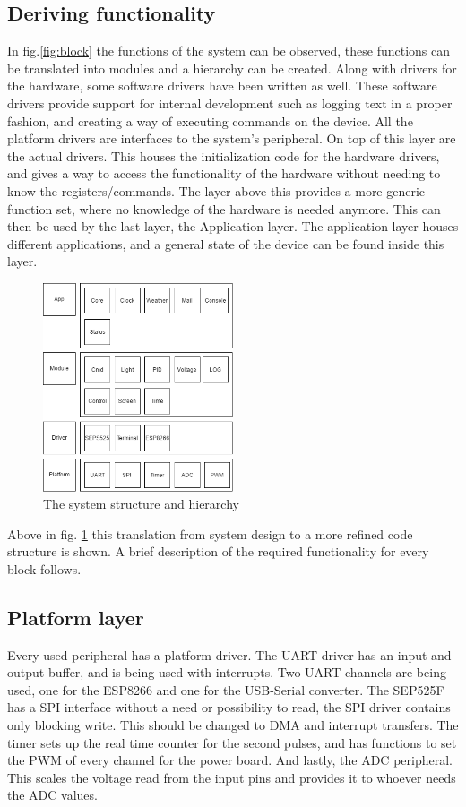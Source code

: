 \subsection{Deriving functionality}
In fig.\ref{fig:block} the functions of the system can be observed, these functions can be translated into modules and a hierarchy can be created. Along with drivers for the hardware, some software drivers have been written as well. These software drivers provide support for internal development such as logging text in a proper fashion, and creating a way of executing commands on the device. All the platform drivers are interfaces to the system's peripheral. On top of this layer are the actual drivers. This houses the initialization code for the hardware drivers, and gives a way to access the functionality of the hardware without needing to know the registers/commands. The layer above this provides a more generic function set, where no knowledge of the hardware is needed anymore. This can then be used by the last layer, the Application layer. The application layer houses different applications, and a general state of the device can be found inside this layer.
\begin{figure}[H]
	\centering
	\label{fig:block_code}
	\includegraphics[width=0.5\textwidth]{fig/block_code.png}
	\caption{The system structure and hierarchy}
\end{figure}
Above in fig. \ref{fig:block_code} this translation from system design to a more refined code structure is shown. A brief description of the required functionality for every block follows. 

\subsection{Platform layer}

Every used peripheral has a platform driver. The UART driver has an input and output buffer, and is being used with interrupts. Two UART channels are being used, one for the ESP8266 and one for the USB-Serial converter. The SEP525F has a SPI interface without a need or possibility to read, the SPI driver contains only blocking write. This should be changed to DMA and interrupt transfers. The timer sets up the real time counter for the second pulses, and has functions to set the PWM of every channel for the power board. And lastly, the ADC peripheral. This scales the voltage read from the input pins and provides it to whoever needs the ADC values.
